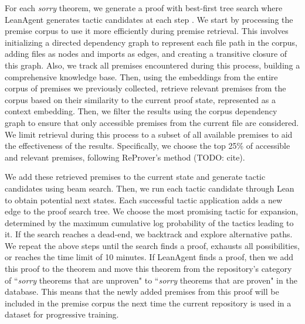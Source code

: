 \documentclass{article} %
\begin{document}

For each \textit{sorry} theorem, we generate a proof with best-first tree search where LeanAgent generates tactic candidates at each step \citep{hanProofArtifactCotraining2021, jiangThorWieldingHammers2022, poluFormalMathematicsStatement2022, zhengMiniF2FCrosssystemBenchmark2021}. We start by processing the premise corpus to use it more efficiently during premise retrieval. This involves initializing a directed dependency graph to represent each file path in the corpus, adding files as nodes and imports as edges, and creating a transitive closure of this graph. Also, we track all premises encountered during this process, building a comprehensive knowledge base. Then, using the embeddings from the entire corpus of premises we previously collected, retrieve relevant premises from the corpus based on their similarity to the current proof state, represented as a context embedding. Then, we filter the results using the corpus dependency graph to ensure that only accessible premises from the current file are considered. We limit retrieval during this process to a subset of all available premises to aid the effectiveness of the results. Specifically, we choose the top 25\% of accessible and relevant premises, following ReProver's method (TODO: cite).

We add these retrieved premises to the current state and generate tactic candidates using beam search. Then, we run each tactic candidate through Lean to obtain potential next states. Each successful tactic application adds a new edge to the proof search tree. We choose the most promising tactic for expansion, determined by the maximum cumulative log probability of the tactics leading to it. If the search reaches a dead-end, we backtrack and explore alternative paths. We repeat the above steps until the search finds a proof, exhausts all possibilities, or reaches the time limit of 10 minutes. If LeanAgent finds a proof, then we add this proof to the theorem and move this theorem from the repository's category of ``\textit{sorry} theorems that are unproven" to ``\textit{sorry} theorems that are proven" in the database. This means that the newly added premises from this proof will be included in the premise corpus the next time the current repository is used in a dataset for progressive training.
\end{document}
